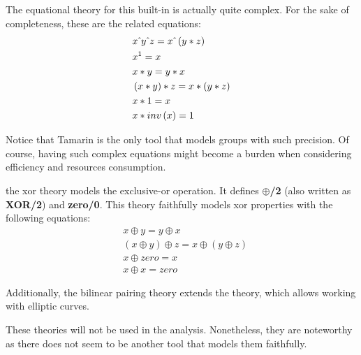 \begin{description}[style=nextline]
        The equational theory for this built-in is actually quite complex. For the sake of completeness, these are the related equations:
        \begin{equation}
            \begin{aligned}
                 & x \hat{\mkern6mu} y \hat{\mkern6mu} z = x \hat{\mkern6mu} \left(y * z\right) \\
                 & x ^ 1 = x                                         \\
                 & x * y = y * x                                     \\
                 & \left(x * y\right) * z = x * \left(y * z\right)   \\
                 & x * 1 = x                                         \\
                 & x * inv\left(x\right) = 1
            \end{aligned}
        \end{equation}

        Notice that Tamarin is the only tool that models groups with such precision. Of course, having such complex equations might become a burden when considering efficiency and resources consumption.
    \item[xor and bilinear-pairing] the xor theory models the exclusive-or operation. It defines \textbf{$\oplus$/2} (also written as \textbf{XOR/2}) and \textbf{zero/0}. This theory faithfully models xor properties with the following equations:
        \begin{equation}
            \begin{aligned}
                 & x \oplus y = y \oplus x                                             \\
                 & \left(x \oplus y\right) \oplus z = x \oplus \left(y \oplus z\right) \\
                 & x \oplus zero = x                                                   \\
                 & x \oplus x = zero
            \end{aligned}
        \end{equation}

        Additionally, the bilinear pairing theory extends the \DiHe{} theory, which allows working with elliptic curves.

        These theories will not be used in the analysis. Nonetheless, they are noteworthy as there does not seem to be another tool that models them faithfully.
\end{description}

